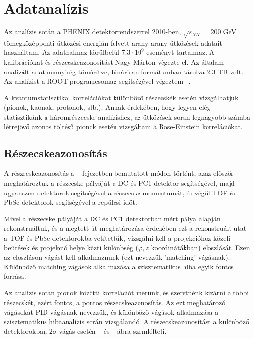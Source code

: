 \documentclass[11pt,a4paper]{article}
\numberwithin{equation}{subsection}
\numberwithin{figure}{section}
\begin{document}
\section{Adatanalízis}

Az analízis során a PHENIX detektorrendszerrel 2010-ben, $\sqrt{s_{NN}}=200\;\mathrm{GeV}$ tömegközépponti ütközési energián felvett arany-arany ütközések adatait használtam. Az adathalmaz körülbelül $7.3\cdot 10^9$ eseményt tartalmaz. A kalibrációkat és részecskeazonosítást Nagy Márton végezte el. Az általam analizált adatmennyiség tömörítve, binárisan formátumban tárolva $2.3$ TB volt. Az analízist a ROOT programcsomag segítségével végeztem ~\cite{root}.

A kvantumstatisztikai korrelációkat különböző részecskék esetén vizsgálhatjuk (pionok, kaonok, protonok, stb.). Annak érdekében, hogy legyen elég statisztikánk a háromrészecske analízishez, az ütközések során legnagyobb számba létrejövő azonos töltésű pionok esetén vizsgáltam a Bose-Einstein korrelációkat.

\subsection{Részecskeazonosítás}

A részecskeazonosítás a ~ fejezetben bemutatott módon történt, azaz először meghatároztuk a részecske pályáját a DC és PC1 detektor segítségével, majd ugyanezen detektorok segítségével a részecske momentumát, és végül  TOF és PbSc detektorok segítségével a repülési időt.

Mivel a részecske pályáját a DC és PC1 detektorban mért pálya alapján rekonstruáltuk, és a megtett út meghatározása érdekében ezt a rekonstruált utat a TOF és PbSc detektorokba vetítettük, vizsgálni kell a projekcióhoz közeli beütések és projekció helye közti különbség ($\varphi, z$ koordinátákban) eloszlását. Ezen az eloszláson vágást kell alkalmaznunk (ezt nevezzük 'matching' vágásnak). Különböző matching vágások alkalmazása a szisztematikus hiba egyik fontos forrása.

Az analízis során pionok közötti korrelációt mérünk, és szeretnénk kizárni a többi részecskét, ezért fontos, a pontos részecskeazonosítás. Az ezt meghatározó vágásokat PID vágásnak nevezzük, és különböző vágások alkalmazása a szisztematikus hibaanalízis során vizsgálandó. A részecskeazonosítást a különböző detektorokban $2\sigma$ vágás esetén ~ és ~ ábra szemlélteti.
\end{document}
